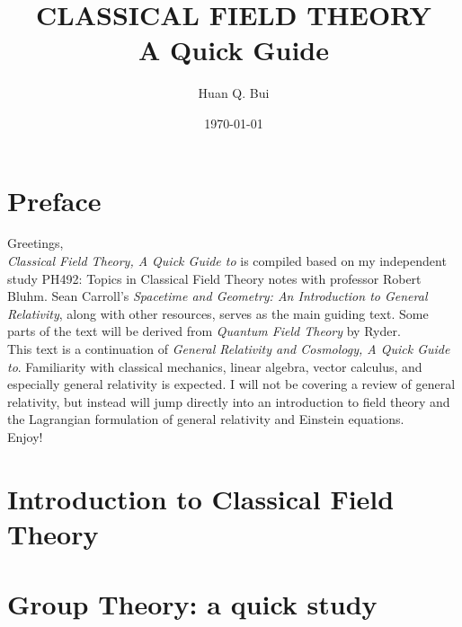 \documentclass[a4paper,11pt]{article}
\numberwithin{equation}{section}
\theoremstyle{definition}
\begin{document}
\begin{titlepage}\centering
 \clearpage
 \title{\textsc{\bf{CLASSICAL FIELD THEORY}}\\\smallskip A Quick Guide\\}
 \author{\bigskip Huan Q. Bui}
 \date{\today}
 \maketitle
 \thispagestyle{empty}
\end{titlepage}

\newpage

\section*{Preface}

Greetings,\\

\textit{Classical Field Theory, A Quick Guide to} is compiled based on my independent study PH492: Topics in Classical Field Theory notes with professor Robert Bluhm. Sean Carroll's \textit{Spacetime and Geometry: An Introduction to General Relativity}, along with other resources, serves as the main guiding text. Some parts of the text will be derived from \textit{Quantum Field Theory} by Ryder.  \\

This text is a continuation of \textit{General Relativity and Cosmology, A Quick Guide to}. Familiarity with classical mechanics, linear algebra, vector calculus, and especially general relativity is expected. I will not be covering a review of general relativity, but instead will jump directly into an introduction to field theory and the Lagrangian formulation of general relativity and Einstein equations.\\ 

Enjoy!


\newpage

\tableofcontents

\newpage

\section{Introduction to Classical Field Theory}
\newpage
\section{Group Theory: a quick study}
\newpage
\end{document}
